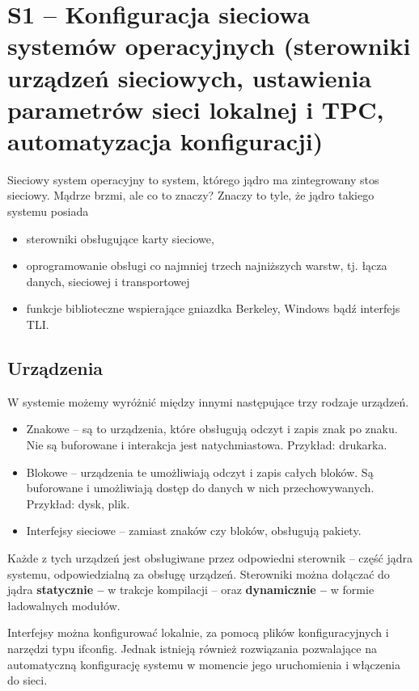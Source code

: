 \section{S1 -- Konfiguracja sieciowa systemów operacyjnych (sterowniki urządzeń sieciowych, ustawienia parametrów sieci lokalnej i TPC, automatyzacja konfiguracji)}

Sieciowy system operacyjny to system, którego jądro ma zintegrowany stos sieciowy.
Mądrze brzmi, ale co to znaczy?
Znaczy to tyle, że jądro takiego systemu posiada
\begin{itemize}
	\item{sterowniki obsługujące karty sieciowe,}
	\item{oprogramowanie obsługi co najmniej trzech najniższych warstw, tj. łącza danych, sieciowej i transportowej}
	\item{funkcje biblioteczne wspierające gniazdka Berkeley, Windows bądź interfejs TLI.}
\end{itemize}

\subsection{Urządzenia}
W systemie możemy wyróżnić między innymi następujące trzy rodzaje urządzeń.

\begin{itemize}
	\item{Znakowe -- są to urządzenia, które obsługują odczyt i zapis znak po znaku. Nie są buforowane i interakcja jest natychmiastowa. Przykład: drukarka.}
	\item{Blokowe -- urządzenia te umożliwiają odczyt i zapis całych bloków. Są buforowane i umożliwiają dostęp do danych w nich przechowywanych. Przykład: dysk, plik.}
	\item{Interfejsy sieciowe -- zamiast znaków czy bloków, obsługują pakiety.}
\end{itemize}

Każde z tych urządzeń jest obsługiwane przez odpowiedni sterownik -- część jądra systemu, odpowiedzialną za obsługę urządzeń.
Sterowniki można dołączać do jądra \textbf{statycznie -- } w trakcje kompilacji -- oraz \textbf{dynamicznie -- } w formie ładowalnych modułów.

Interfejsy można konfigurować lokalnie, za pomocą plików konfiguracyjnych i narzędzi typu ifconfig.
Jednak istnieją również rozwiązania pozwalające na automatyczną konfigurację systemu w momencie jego uruchomienia i włączenia do sieci.

